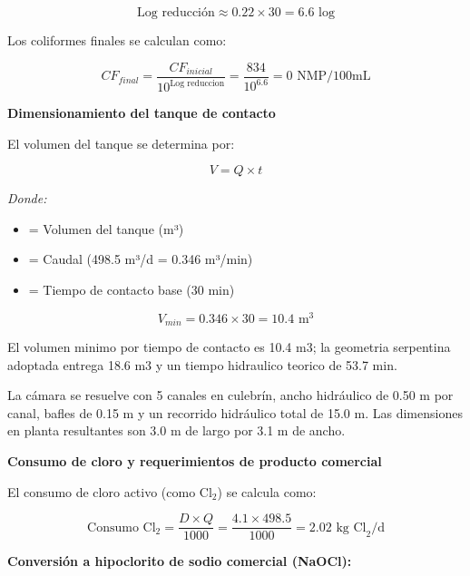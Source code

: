 \documentclass[12pt,a4paper]{article}
\begin{document}
\begin{equation}
\text{Log reducción} \approx 0.22 \times 30 = 6.6 \text{ log}
\end{equation}

Los coliformes finales se calculan como:

\begin{equation}
CF_{final} = \frac{CF_{inicial}}{10^{\text{Log reduccion}}} = \frac{834}{10^{6.6}} = 0 \text{ NMP/100mL}
\end{equation}

\textbf{Dimensionamiento del tanque de contacto}

El volumen del tanque se determina por:

\begin{equation}
V = Q \times t
\end{equation}

\textit{Donde:}
\begin{itemize}[noitemsep,leftmargin=2em]
    \item[$V$] = Volumen del tanque (m³)
    \item[$Q$] = Caudal (498.5 m³/d = 0.346 m³/min)
    \item[$t$] = Tiempo de contacto base (30 min)
\end{itemize}

\begin{equation}
V_{min} = 0.346 \times 30 = 10.4 \text{ m}^3
\end{equation}

El volumen minimo por tiempo de contacto es 10.4 m3; la geometria serpentina adoptada entrega 18.6 m3 y un tiempo hidraulico teorico de 53.7 min.

La cámara se resuelve con 5 canales en culebrín, ancho hidráulico de 0.50 m por canal, bafles de 0.15 m y un recorrido hidráulico total de 15.0 m. Las dimensiones en planta resultantes son 3.0 m de largo por 3.1 m de ancho.

\textbf{Consumo de cloro y requerimientos de producto comercial}

El consumo de cloro activo (como Cl$_2$) se calcula como:

\begin{equation}
\text{Consumo Cl}_2 = \frac{D \times Q}{1000} = \frac{4.1 \times 498.5}{1000} = 2.02 \text{ kg Cl}_2\text{/d}
\end{equation}

\textbf{Conversión a hipoclorito de sodio comercial (NaOCl):}
\end{document}
